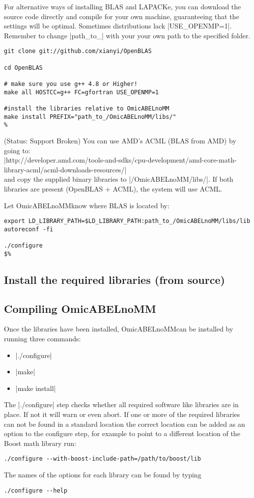 \documentclass{report}
\newcommand{\oanomm}{OmicABELnoMM}
\begin{document}
For alternative ways of installing \ac{BLAS} and LAPACKe, you can download
the source code directly and compile for your own machine, guaranteeing
that the settings will be optimal. Sometimes distributions lack
|USE_OPENMP=1|.  Remember to change |path_to_| with your your own path
to the specified folder.

\begin{lstlisting}[escapechar=\%]
git clone git://github.com/xianyi/OpenBLAS

cd OpenBLAS

# make sure you use g++ 4.8 or Higher!
make all HOSTCC=g++ FC=gfortran USE_OPENMP=1

#install the libraries relative to OmicABELnoMM
make install PREFIX="path_to_/OmicABELnoMM/libs/"
%
\end{lstlisting}
(Status: Support Broken)
You can use AMD's ACML (\ac{BLAS} from AMD) by going to:\\
|http://developer.amd.com/tools-and-sdks/cpu-development/amd-core-math-library-acml/acml-downloads-resources/|\\
and copy the supplied binary libraries to |/OmicABELnoMM/libs/|. If
both libraries are present (OpenBLAS + ACML), the system will use
ACML.

Let \oanomm know where \ac{BLAS} is located by:
\begin{lstlisting}[escapechar=\%]
export LD_LIBRARY_PATH=$LD_LIBRARY_PATH:path_to_/OmicABELnoMM/libs/lib
autoreconf -fi

./configure
$%
\end{lstlisting}

\subsection{Install the required libraries (from source)}

\subsection{Compiling \oanomm}
Once the libraries have been installed, \oanomm can be installed by
running three commands:
\begin{itemize}
\item |./configure|
\item |make|
\item |make install|
\end{itemize}
The |./configure| step checks whether all required software like
libraries are in place. If not it will warn or even abort. If one or
more of the required libraries can not be found in a standard location
the correct location can be added as an option to the configure step,
for example to point to a different location of the Boost math library
run:
\begin{lstlisting}
./configure --with-boost-include-path=/path/to/boost/lib
\end{lstlisting}
The names of the options for each library can be found by typing
\begin{lstlisting}
./configure --help
\end{lstlisting}
\end{document}
